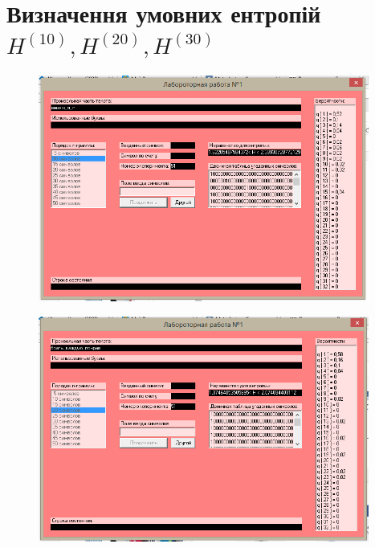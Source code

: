 \documentclass[a4paper,12pt]{article}
\begin{document}
\section*{Визначення умовних ентропій \( H^{(10)}, H^{(20)}, H^{(30)} \) }
\begin{figure}[h]
  \begin{center}
    \includegraphics[width=0.97\textwidth]{1.png}
  \end{center}
\end{figure}
\begin{figure}[h]
  \begin{center}
    \includegraphics[width=0.97\textwidth]{2.png}
  \end{center}
\end{figure}
\end{document}
